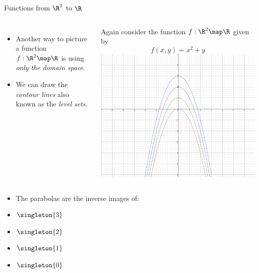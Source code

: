 \documentclass{beamer}
\begin{document}
\begin{frame}{Functions from $\R^2$ to $\R$}


\begin{columns}
\column[T]{5cm}
\begin{itemize}
\item Another way to picture a function $f:\R^2\map\R$ is using
\emph{only the domain space}.
\item  We can draw the \emph{contour lines} also known as the \emph{level sets}.
\end{itemize}

Again consider the function $f:\R^2\map\R$ given by
$$f(x,y) = x^2 + y$$
\column[T]{5cm}
\includegraphics[scale=0.1]{contour-parabolas}
\end{columns}


\begin{itemize}
\item The parabolas are the inverse images of:
\item $\singleton{3}$
\item $\singleton{2}$
\item $\singleton{1}$
\item $\singleton{0}$
\end{itemize}
\end{frame}
\end{document}

